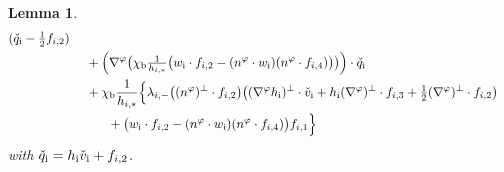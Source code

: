 \documentclass[11pt]{article}
\newtheorem{lemma}[theorem]{Lemma}
\theoremstyle{definition}
\begin{document}
\begin{lemma}
\begin{align*}
(\check{q}_\mathrm{i}-\tfrac12f_{{\rm i},2}) \\
&\quad\;
+ \Bigl(\nabla^\varphi\bigl(\chi_\mathrm{b}\tfrac{1}{h_{{\rm i},*}}
\bigl(w_\mathrm{i}\cdot f_{{\rm i},2}-(n^\varphi\cdot w_\mathrm{i})(n^\varphi\cdot f_{{\rm i},4}) \bigr) \bigr) \Bigr)\cdot\check{q}_\mathrm{i} \\
&\quad\;
+ \chi_\mathrm{b}\frac{1}{h_{{\rm i},*}}\Bigl\{
\lambda_{{\rm i},-}\bigl((n^\varphi)^\perp\cdot f_{{\rm i},2}\bigr)\bigl((\nabla^\varphi h_\mathrm{i})^\perp\cdot\check{v}_\mathrm{i}
+ h_\mathrm{i}(\nabla^\varphi)^\perp\cdot f_{{\rm i},3} + \tfrac12(\nabla^\varphi)^\perp\cdot f_{{\rm i},2} \bigr) \\
&\makebox[3em]{}
+ \bigl(w_\mathrm{i}\cdot f_{{\rm i},2}-(n^\varphi\cdot w_\mathrm{i})(n^\varphi\cdot f_{{\rm i},4}) \bigr)f_{{\rm i},1} \Bigr\}
\end{align*}
with $\check{q}_\mathrm{i}=h_\mathrm{i}\check{v}_\mathrm{i}+f_{{\rm i},2}$.
\end{lemma}
\end{document}
